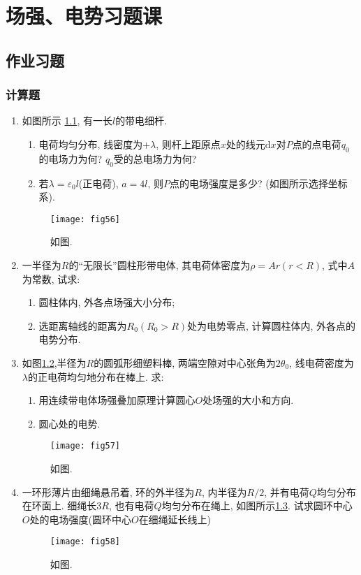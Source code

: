 \chapter{场强、电势习题课}
\section{作业习题}
\subsection*{计算题}
\begin{enumerate}
    \item 如图所示 \ref{fig:56}, 有一长$l$的带电细杆.
    \begin{enumerate}
        \item[(1)] 电荷均匀分布, 线密度为$+\lambda$, 则杆上距原点$x$处的线元$\mathrm{d}x$对$P$点的点电荷$q_0$的电场力为何? $q_0$受的总电场力为何?
        \item[(2)] 若$\lambda=\varepsilon_0 l$(正电荷), $a=4l$, 则$P$点的电场强度是多少? (如图所示选择坐标系).
        
    \end{enumerate}
    \begin{figure}[H]
        \centering
        \texttt{[image: fig56]}
        \caption{如图.}\label{fig:56}
    \end{figure}
    \item 一半径为$R$的“无限长”圆柱形带电体, 其电荷体密度为$\rho=Ar(r<R)$, 式中$A$为常数, 试求:
    \begin{enumerate}
        \item[(1)] 圆柱体内, 外各点场强大小分布;
        \item[(2)] 选距离轴线的距离为$R_0(R_0>R)$处为电势零点, 计算圆柱体内, 外各点的电势分布.
    \end{enumerate}
    \item 如图\ref{fig:57},半径为$R$的圆弧形细塑料棒, 两端空隙对中心张角为$2\theta_0$, 线电荷密度为$\lambda$的正电荷均匀地分布在棒上. 求:
    \begin{enumerate}
        \item[(1)] 用连续带电体场强叠加原理计算圆心$O$处场强的大小和方向.
        \item[(2)] 圆心处的电势.
    \end{enumerate}
    \begin{figure}[H]
        \centering
        \texttt{[image: fig57]}
        \caption{如图.}\label{fig:57}
    \end{figure}
    \item  一环形薄片由细绳悬吊着, 环的外半径为$R$, 内半径为$R/2$, 并有电荷$Q$均匀分布在环面上. 细绳长$3R$, 也有电荷$Q$均匀分布在绳上, 如图所示\ref{fig:58}. 试求圆环中心$O$处的电场强度(圆环中心$O$在细绳延长线上)
    \begin{figure}[H]
        \centering
        \texttt{[image: fig58]}
        \caption{如图.}\label{fig:58}
    \end{figure}
\end{enumerate}